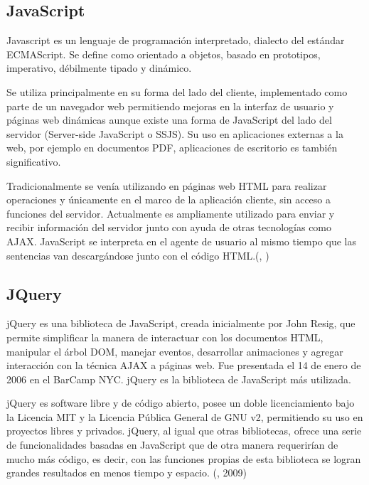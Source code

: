 \subsection{JavaScript}
\setlength{\parskip}{5mm}
Javascript es un lenguaje de programación interpretado, dialecto del estándar ECMAScript. Se define como orientado a objetos, basado en prototipos, imperativo, débilmente tipado y dinámico.

Se utiliza principalmente en su forma del lado del cliente, implementado como parte de un navegador web permitiendo mejoras en la interfaz de usuario y páginas web dinámicas aunque existe una forma de JavaScript del lado del servidor (Server-side JavaScript o SSJS). Su uso en aplicaciones externas a la web, por ejemplo en documentos PDF, aplicaciones de escritorio es también significativo.

Tradicionalmente se venía utilizando en páginas web HTML para realizar operaciones y únicamente en el marco de la aplicación cliente, sin acceso a funciones del servidor. Actualmente es ampliamente utilizado para enviar y recibir información del servidor junto con ayuda de otras tecnologías como AJAX. JavaScript se interpreta en el agente de usuario al mismo tiempo que las sentencias van descargándose junto con el código HTML.(\citeauthor{javascripbib}, \citeyear{javascripbib})
\setlength{\parskip}{0mm}


\subsection{JQuery}
\setlength{\parskip}{5mm}
jQuery es una biblioteca de JavaScript, creada inicialmente por John Resig, que permite simplificar la manera de interactuar con los documentos HTML, manipular el árbol DOM, manejar eventos, desarrollar animaciones y agregar interacción con la técnica AJAX a páginas web. Fue presentada el 14 de enero de 2006 en el BarCamp NYC. jQuery es la biblioteca de JavaScript más utilizada.

jQuery es software libre y de código abierto, posee un doble licenciamiento bajo la Licencia MIT y la Licencia Pública General de GNU v2, permitiendo su uso en proyectos libres y privados. jQuery, al igual que otras bibliotecas, ofrece una serie de funcionalidades basadas en JavaScript que de otra manera requerirían de mucho más código, es decir, con las funciones propias de esta biblioteca se logran grandes resultados en menos tiempo y espacio.
\setlength{\parskip}{0mm}
(\citet{jquerybib}, 2009)

